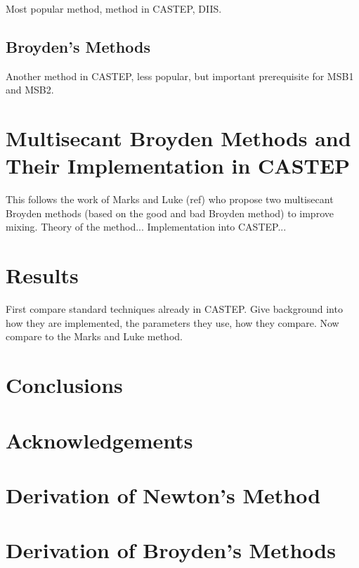 \documentclass[final,3p,twocolumn]{elsarticle}
\begin{document}
Most popular method, method in CASTEP, DIIS.

\subsection{Broyden's Methods}

Another method in CASTEP, less popular, but important prerequisite for MSB1 and MSB2. 


\section{Multisecant Broyden Methods and Their Implementation in CASTEP}

This follows the work of Marks and Luke (ref) who propose two multisecant Broyden methods (based on the good and bad Broyden method) to improve mixing. Theory of the method... Implementation into CASTEP...

\section{Results}

First compare standard techniques already in CASTEP. Give background into how they are implemented, the parameters they use, how they compare. 
Now compare to the Marks and Luke method.

\section{Conclusions}


\section*{Acknowledgements}


\appendix

\section{Derivation of Newton's Method}

\section{Derivation of Broyden's Methods}


\end{document}
